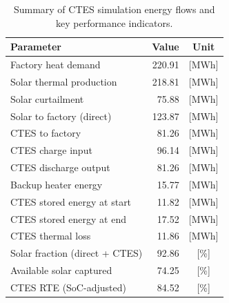 \renewcommand{\arraystretch}{1.2}
\begin{table}[h]
\centering
\begin{tabular}{l|r c}
\hline
Parameter & Value & Unit \\
\hline
Factory heat demand & 220.91 & [MWh] \\
Solar thermal production & 218.81 & [MWh] \\
Solar curtailment & 75.88 & [MWh] \\
Solar to factory (direct) & 123.87 & [MWh] \\
CTES to factory & 81.26 & [MWh] \\
CTES charge input & 96.14 & [MWh] \\
CTES discharge output & 81.26 & [MWh] \\
Backup heater energy & 15.77 & [MWh] \\
CTES stored energy at start & 11.82 & [MWh] \\
CTES stored energy at end & 17.52 & [MWh] \\
CTES thermal loss & 11.86 & [MWh] \\
\hline
Solar fraction (direct + CTES) & 92.86 & [\%] \\
Available solar captured & 74.25 & [\%] \\
CTES RTE (SoC-adjusted) & 84.52 & [\%] \\
\hline
\end{tabular}
\caption{Summary of CTES simulation energy flows and key performance indicators.}
\label{tab:ctes-simulation-summary}
\end{table}
